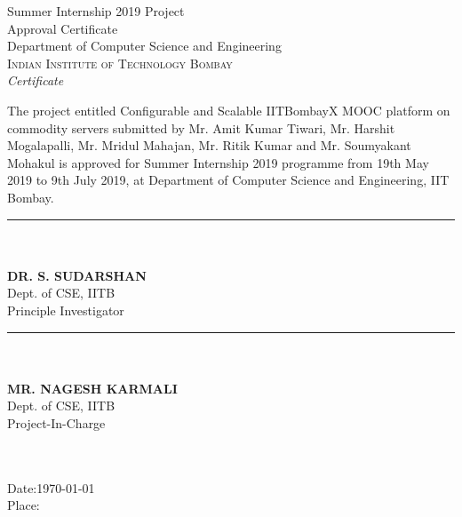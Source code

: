 \documentclass[12pt]{report}
\begin{document}
	\pagebreak
	\newpage
	\thispagestyle{empty}
	
	\begin{center}
		\huge{Summer Internship 2019 Project}\\[0.5cm]
		Approval Certificate\\[1.0cm]
		\huge{Department of Computer Science and Engineering}\\[0.5cm]
		\normalsize
		\textsc{Indian Institute of Technology Bombay}\\[2.0cm]
		
		\emph{\LARGE Certificate}\\[2.5cm]
	\end{center}
	\normalsize The project entitled Configurable and Scalable IITBombayX MOOC platform on commodity servers submitted by Mr. Amit Kumar Tiwari, Mr. Harshit Mogalapalli, Mr. Mridul Mahajan, Mr. Ritik Kumar and Mr. Soumyakant Mohakul is approved for Summer Internship 2019 programme from 19th May 2019 to 9th July 2019, at Department of Computer Science
	and Engineering, IIT Bombay.\\[1.0cm]
	
	\begin{multicols}{2}
		\noindent\rule{5cm}{0.4pt}\\
		\textbf{\\DR. S. SUDARSHAN} \\
		Dept. of CSE, IITB \\
		Principle Investigator \\
		\columnbreak
		
		\noindent\rule{5cm}{0.4pt}\\
		\textbf{\\MR. NAGESH KARMALI} \\
		Dept. of CSE, IITB \\
		Project-In-Charge \\
		\textbf{\\\\}
	\end{multicols}
	
	\begin{flushleft}
		Date:\today \\
		Place:
	\end{flushleft}
	\pagebreak
	
	\setcounter{page}{1}
	
	\listoffigures
	
	\pagebreak
	
\end{document}
